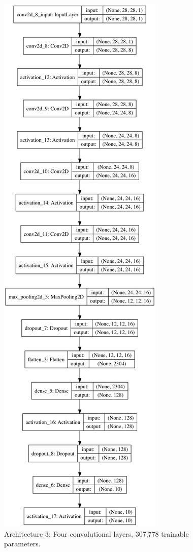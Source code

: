 \documentclass[letterpaper, 10 pt, conference]{ieeeconf}  %
\begin{document}
\begin{figure}[H]
      \centering
      \includegraphics[scale = .3]{model2.png}
		\centering
      \caption{Architecture 3: Four convolutional layers, 307,778 trainable parameters.}
      \label{figurelabel}
   \end{figure}
   
\end{document}

